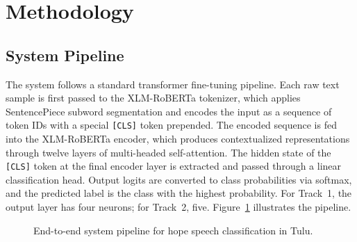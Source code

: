 \documentclass[11pt]{article}
\begin{document}
\section{Methodology}

\subsection{System Pipeline}

The system follows a standard transformer fine-tuning pipeline. Each raw text sample is first passed
to the XLM-RoBERTa tokenizer, which applies
SentencePiece subword segmentation and encodes
the input as a sequence of token IDs with a special
\texttt{[CLS]} token prepended. The encoded sequence
is fed into the XLM-RoBERTa encoder, which
produces contextualized representations through
twelve layers of multi-headed self-attention. The
hidden state of the \texttt{[CLS]} token at the final encoder layer is extracted and passed through a linear
classification head. Output logits are converted to
class probabilities via softmax, and the predicted
label is the class with the highest probability. For
Track~1, the output layer has four neurons; for
Track~2, five. Figure~\ref{fig:pipeline} illustrates the pipeline.

\begin{figure}[h]
\centering
{}
\caption{End-to-end system pipeline for hope speech classification in Tulu.}
\label{fig:pipeline}
\end{figure}
\end{document}
